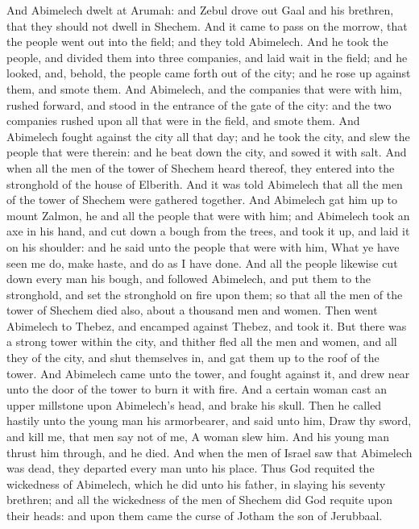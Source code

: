 And Abimelech dwelt at Arumah: and Zebul drove out Gaal and his brethren, that they should not dwell in Shechem. And it came to pass on the morrow, that the people went out into the field; and they told Abimelech. And he took the people, and divided them into three companies, and laid wait in the field; and he looked, and, behold, the people came forth out of the city; and he rose up against them, and smote them. And Abimelech, and the companies that were with him, rushed forward, and stood in the entrance of the gate of the city: and the two companies rushed upon all that were in the field, and smote them. And Abimelech fought against the city all that day; and he took the city, and slew the people that were therein: and he beat down the city, and sowed it with salt.  And when all the men of the tower of Shechem heard thereof, they entered into the stronghold of the house of Elberith. And it was told Abimelech that all the men of the tower of Shechem were gathered together. And Abimelech gat him up to mount Zalmon, he and all the people that were with him; and Abimelech took an axe in his hand, and cut down a bough from the trees, and took it up, and laid it on his shoulder: and he said unto the people that were with him, What ye have seen me do, make haste, and do as I have done. And all the people likewise cut down every man his bough, and followed Abimelech, and put them to the stronghold, and set the stronghold on fire upon them; so that all the men of the tower of Shechem died also, about a thousand men and women.  Then went Abimelech to Thebez, and encamped against Thebez, and took it. But there was a strong tower within the city, and thither fled all the men and women, and all they of the city, and shut themselves in, and gat them up to the roof of the tower. And Abimelech came unto the tower, and fought against it, and drew near unto the door of the tower to burn it with fire. And a certain woman cast an upper millstone upon Abimelech’s head, and brake his skull. Then he called hastily unto the young man his armorbearer, and said unto him, Draw thy sword, and kill me, that men say not of me, A woman slew him. And his young man thrust him through, and he died. And when the men of Israel saw that Abimelech was dead, they departed every man unto his place. Thus God requited the wickedness of Abimelech, which he did unto his father, in slaying his seventy brethren; and all the wickedness of the men of Shechem did God requite upon their heads: and upon them came the curse of Jotham the son of Jerubbaal. 

